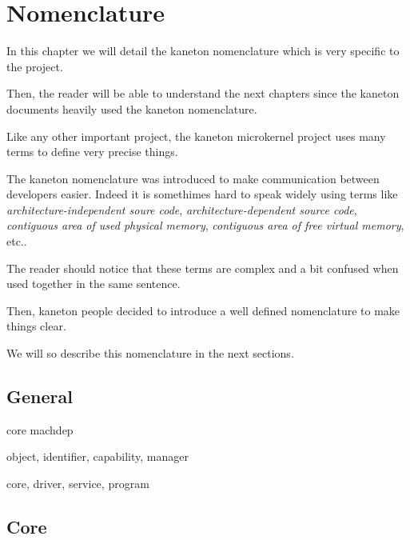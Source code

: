 
%
%

\chapter{Nomenclature}

In this chapter we will detail the kaneton nomenclature which is very
specific to the project.

Then, the reader will be able to understand the next chapters since the
kaneton documents heavily used the kaneton nomenclature.

\newpage

%
%

Like any other important project, the kaneton microkernel project
uses many terms to define very precise things.

The kaneton nomenclature was introduced to make communication between
developers easier. Indeed it is somethimes hard to speak widely using
terms like \textit{architecture-independent soure code},
\textit{architecture-dependent source code}, \textit{contiguous area
of used physical memory}, \textit{contiguous area of free virtual memory},
etc..

The reader should notice that these terms are complex and a bit confused
when used together in the same sentence.

Then, kaneton people decided to introduce a well defined nomenclature
to make things clear.

We will so describe this nomenclature in the next sections.

%
%

\section{General}

core machdep

object, identifier, capability, manager

core, driver, service, program

%
%

\section{Core}


